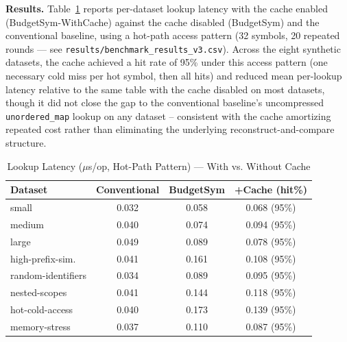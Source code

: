 \documentclass[conference]{IEEEtran}
\begin{document}
\textbf{Results.} Table~\ref{tab:cache} reports per-dataset lookup latency
with the cache enabled (BudgetSym-WithCache) against the cache disabled
(BudgetSym) and the conventional baseline, using a hot-path access pattern
(32 symbols, 20 repeated rounds --- see \texttt{results/benchmark\_results\_v3.csv}).
Across the eight synthetic datasets, the cache achieved a hit rate of 95\%
under this access pattern (one necessary cold miss per hot symbol, then all
hits) and reduced mean per-lookup latency relative to the same table with
the cache disabled on most datasets, though it did not close the gap to the
conventional baseline's uncompressed \texttt{unordered\_map} lookup on any
dataset -- consistent with the cache amortizing repeated cost rather than
eliminating the underlying reconstruct-and-compare structure.

\begin{table}[htbp]
\caption{Lookup Latency ($\mu$s/op, Hot-Path Pattern) --- With vs. Without Cache}
\label{tab:cache}
\centering
\small
\begin{tabular}{lccc}
\toprule
Dataset & Conventional & BudgetSym & +Cache (hit\%) \\
\midrule
small & 0.032 & 0.058 & 0.068 (95\%) \\
medium & 0.040 & 0.074 & 0.094 (95\%) \\
large & 0.049 & 0.089 & 0.078 (95\%) \\
high-prefix-sim. & 0.041 & 0.161 & 0.108 (95\%) \\
random-identifiers & 0.034 & 0.089 & 0.095 (95\%) \\
nested-scopes & 0.041 & 0.144 & 0.118 (95\%) \\
hot-cold-access & 0.040 & 0.173 & 0.139 (95\%) \\
memory-stress & 0.037 & 0.110 & 0.087 (95\%) \\
\bottomrule
\end{tabular}
\end{table}
\end{document}
